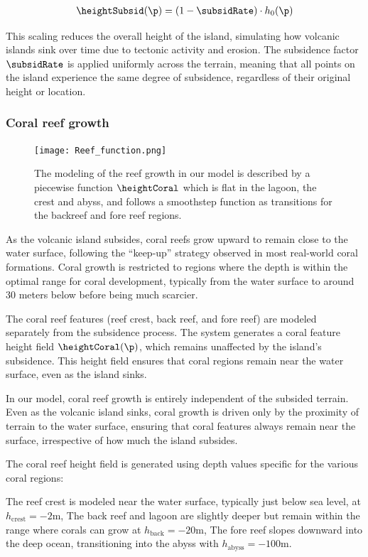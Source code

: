 \begin{align}
    \heightSubsid(\p) = (1 - \subsidRate) \cdot h_0(\p)
\end{align}

This scaling reduces the overall height of the island, simulating how volcanic islands sink over time due to tectonic activity and erosion. The subsidence factor $\subsidRate$ is applied uniformly across the terrain, meaning that all points on the island experience the same degree of subsidence, regardless of their original height or location.

\subsubsection{Coral reef growth}

\begin{figure}[H]
    \texttt{[image: Reef\_function.png]}
    \caption{The modeling of the reef growth in our model is described by a piecewise function $\heightCoral$ which is flat in the lagoon, the crest and abyss, and follows a smoothstep function as transitions for the backreef and fore reef regions. }
    \label{fig:coral-island_reef-function}
\end{figure}

As the volcanic island subsides, coral reefs grow upward to remain close to the water surface, following the “keep-up” strategy observed in most real-world coral formations. Coral growth is restricted to regions where the depth is within the optimal range for coral development, typically from the water surface to around 30 meters below before being much scarcier.

The coral reef features (reef crest, back reef, and fore reef) are modeled separately from the subsidence process. The system generates a coral feature height field $\heightCoral(\p)$, which remains unaffected by the island's subsidence. This height field ensures that coral regions remain near the water surface, even as the island sinks.

In our model, coral reef growth is entirely independent of the subsided terrain. Even as the volcanic island sinks, coral growth is driven only by the proximity of terrain to the water surface, ensuring that coral features always remain near the surface, irrespective of how much the island subsides.

    The coral reef height field is generated using depth values specific for the various coral regions:
    \begin{Itemize}
        \Item{} The reef crest is modeled near the water surface, typically just below sea level, at $h_\text{crest} = -2$m,
        \Item{} The back reef and lagoon are slightly deeper but remain within the range where corals can grow at $h_\text{back} = -20$m,
        \Item{} The fore reef slopes downward into the deep ocean, transitioning into the abyss with $h_\text{abyss} = -100$m.
    \end{Itemize}

